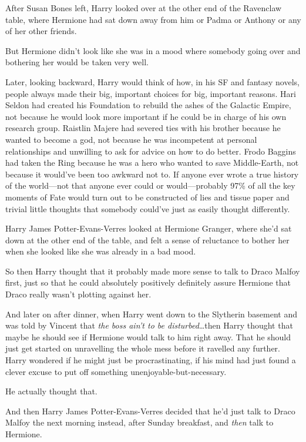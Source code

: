 After Susan Bones left, Harry looked over at the other end of the Ravenclaw table, where Hermione had sat down away from him or Padma or Anthony or any of her other friends.

But Hermione didn’t look like she was in a mood where somebody going over and bothering her would be taken very well.

Later, looking backward, Harry would think of how, in his SF and fantasy novels, people always made their big, important choices for big, important reasons. Hari Seldon had created his Foundation to rebuild the ashes of the Galactic Empire, not because he would look more important if he could be in charge of his own research group. Raistlin Majere had severed ties with his brother because he wanted to become a god, not because he was incompetent at personal relationships and unwilling to ask for advice on how to do better. Frodo Baggins had taken the Ring because he was a hero who wanted to save Middle-Earth, not because it would’ve been too awkward not to. If anyone ever wrote a true history of the world—not that anyone ever could or would—probably 97\% of all the key moments of Fate would turn out to be constructed of lies and tissue paper and trivial little thoughts that somebody could’ve just as easily thought differently.

Harry James Potter-Evans-Verres looked at Hermione Granger, where she’d sat down at the other end of the table, and felt a sense of reluctance to bother her when she looked like she was already in a bad mood.

So then Harry thought that it probably made more sense to talk to Draco Malfoy first, just so that he could absolutely positively definitely assure Hermione that Draco really wasn’t plotting against her.

And later on after dinner, when Harry went down to the Slytherin basement and was told by Vincent that \emph{the boss ain’t to be disturbed}…then Harry thought that maybe he should see if Hermione would talk to him right away. That he should just get started on unravelling the whole mess before it ravelled any further. Harry wondered if he might just be procrastinating, if his mind had just found a clever excuse to put off something unenjoyable-but-necessary.

He actually thought that.

And then Harry James Potter-Evans-Verres decided that he’d just talk to Draco Malfoy the next morning instead, after Sunday breakfast, and \emph{then} talk to Hermione.

